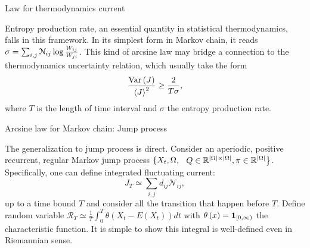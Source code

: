 \documentclass{beamer}
\begin{document}
\begin{frame}{Law for thermodynamics current}
\begin{Rem}
    Entropy production rate, an essential quantity \footnotemark in statistical thermodynamics, falls in this framework. In its simplest form in Markov chain, it reads $\sigma = \sum_{i, j} \mathcal{N}_{ij} \log \frac{W_{ij}}{W_{ji}}$. This kind of arcsine law may bridge a connection to the thermodynamics uncertainty relation\footnotemark, which usually take the form
\begin{equation}\label{uncertain}
    \frac{\operatorname{Var}\left( J \right)}{\left\langle J \right\rangle^2} \geq \frac{2}{T\sigma},
\end{equation}
where $T$ is the length of time interval and $\sigma$ the entropy production rate.
\end{Rem}
\end{frame}


\begin{frame}{Arcsine law for Markov chain: Jump process}
\par
The generalization to jump process is direct. Consider an aperiodic, positive recurrent, regular Markov jump process $\left\{ X_t, \Omega, \right.$ $\left.Q \in \mathbb{R}^{\left| \Omega \right| \times \left| \Omega \right|},  \pi \in \mathbb{R}^{\left| \Omega \right|} \right\}$. Specifically, one can define integrated fluctuating current:
\begin{equation}
    J_T \simeq \sum_{i,j}d_{ij}\mathcal{N}_{ij},
\end{equation}
up to a time bound $T$ and consider all the transition that happen before $T$. Define random variable $\mathcal{R}_T \simeq \frac{1}{T} \int_0^T \theta(X_t-E(X_t))dt$ with $\theta\left( x \right) = \mathbf{1}_{\left[ 0, \infty \right)}$ the characteristic function. It is simple to show this integral is well-defined even in Riemannian sense.

\end{frame}
\end{document}

